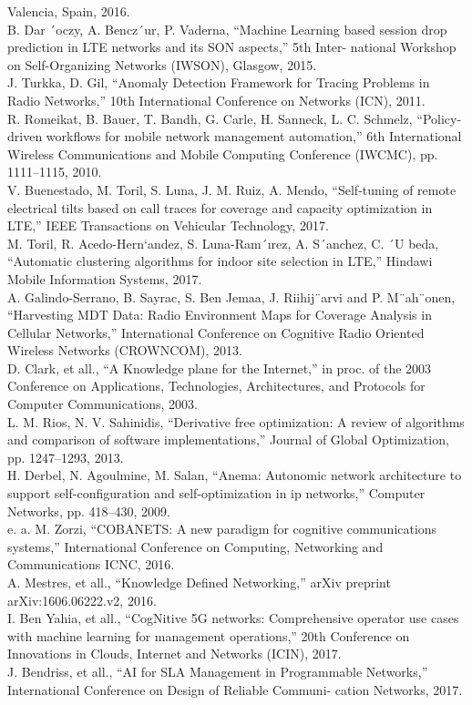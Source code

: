 \documentclass[12pt]{article}
\begin{document}
\begin{multicols}{2}
Valencia, Spain, 2016.
\\ \noindent [184] B. Dar ´oczy, A. Bencz´ur, P. Vaderna, “Machine Learning based session
drop prediction in LTE networks and its SON aspects,” 5th Inter-
national Workshop on Self-Organizing Networks (IWSON), Glasgow,
2015.
\\ \noindent [185] J. Turkka, D. Gil, “Anomaly Detection Framework for Tracing Problems
in Radio Networks,” 10th International Conference on Networks
(ICN), 2011.
\\ \noindent [186] R. Romeikat, B. Bauer, T. Bandh, G. Carle, H. Sanneck, L. C.
Schmelz, “Policy-driven workflows for mobile network management
automation,” 6th International Wireless Communications and Mobile
Computing Conference (IWCMC), pp. 1111–1115, 2010.
\\ \noindent [187] V. Buenestado, M. Toril, S. Luna, J. M. Ruiz, A. Mendo, “Self-tuning
of remote electrical tilts based on call traces for coverage and capacity
optimization in LTE,” IEEE Transactions on Vehicular Technology,
2017.
\\ \noindent [188] M. Toril, R. Acedo-Hern`andez, S. Luna-Ram´ırez, A. S´anchez, C.
´U
beda, “Automatic clustering algorithms for indoor site selection in
LTE,” Hindawi Mobile Information Systems, 2017.
\\ \noindent [189] A. Galindo-Serrano, B. Sayrac, S. Ben Jemaa, J. Riihij¨arvi and P.
M¨ah¨onen, “Harvesting MDT Data: Radio Environment Maps for
Coverage Analysis in Cellular Networks,” International Conference on
Cognitive Radio Oriented Wireless Networks (CROWNCOM), 2013.
\\ \noindent [190] D. Clark, et all., “A Knowledge plane for the Internet,” in proc. of
the 2003 Conference on Applications, Technologies, Architectures, and
Protocols for Computer Communications, 2003.
\\ \noindent [191] L. M. Rios, N. V. Sahinidis, “Derivative free optimization: A review
of algorithms and comparison of software implementations,” Journal
of Global Optimization, pp. 1247–1293, 2013.
\\ \noindent [192] H. Derbel, N. Agoulmine, M. Salan, “Anema: Autonomic network
architecture to support self-configuration and self-optimization in ip
networks,” Computer Networks, pp. 418–430, 2009.
\\ \noindent [193] e. a. M. Zorzi, “COBANETS: A new paradigm for cognitive communications
systems,” International Conference on Computing, Networking
and Communications ICNC, 2016.
\\ \noindent [194] A. Mestres, et all., “Knowledge Defined Networking,” arXiv preprint
arXiv:1606.06222.v2, 2016.
\\ \noindent [195] I. Ben Yahia, et all., “CogNitive 5G networks: Comprehensive operator
use cases with machine learning for management operations,” 20th
Conference on Innovations in Clouds, Internet and Networks (ICIN),
2017.
\\ \noindent [196] J. Bendriss, et all., “AI for SLA Management in Programmable
Networks,” International Conference on Design of Reliable Communi-
cation Networks, 2017.
\end{multicols}
\end{document}
